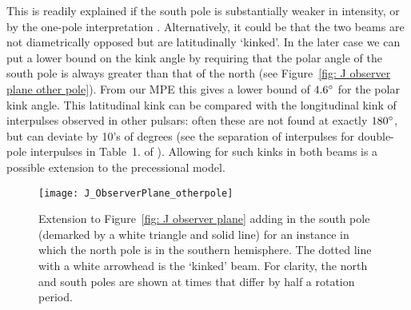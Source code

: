 \documentclass[../full_thesis/full_thesis.tex]{subfiles}
\begin{document}
\begin{subappendices}
This is readily explained if the south pole is substantially weaker in
intensity, or by the one-pole interpretation \citet{Manchester1977}.
Alternatively, it could be that  the two beams are not diametrically opposed
but are latitudinally `kinked'. In the later case we can put a lower bound on
the kink angle by requiring that the polar angle of the south pole is always
greater than that of the north (see Figure~\ref{fig: J observer  plane other
pole}). From our MPE this gives a lower bound of $4.6^{\circ}$ for the polar kink
angle. This latitudinal kink can be compared with the longitudinal kink of
interpulses observed in other pulsars: often these are not found at exactly
$180^{\circ}$, but can deviate by 10's of degrees (see the separation of
interpulses for double-pole interpulses in Table~1. of \cite{Maciesiak2011}).
Allowing for such kinks in both beams is a possible extension to the
precessional model.

\begin{figure}[htb]
\centering
\texttt{[image: J\_ObserverPlane\_otherpole]}
\caption{Extension to Figure~\ref{fig: J observer plane} adding in the south pole
(demarked by a white triangle and solid line) for an instance in which the
north pole is in the southern hemisphere. The dotted line with a white
arrowhead is the `kinked' beam.  For clarity, the north and south poles are
shown at times that differ by half a rotation period.}
\label{fig: J observer plane other pole}
\end{figure}


\end{subappendices}
\end{document}
